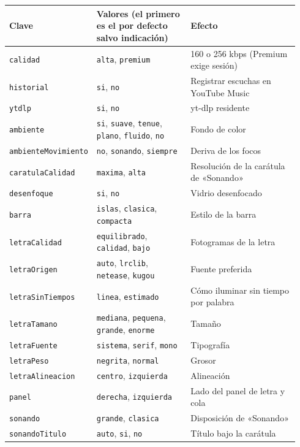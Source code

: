 \begin{center}
\small
\begin{longtable}{@{}p{0.2\linewidth}p{0.34\linewidth}p{0.4\linewidth}@{}}
\toprule
Clave & Valores (el primero es el por defecto salvo indicación) & Efecto \\
\midrule
\endhead
\texttt{calidad} & \texttt{alta}, \texttt{premium} & 160 o 256 kbps (Premium exige sesión) \\
\texttt{historial} & \texttt{si}, \texttt{no} & Registrar escuchas en YouTube Music \\
\texttt{ytdlp} & \texttt{si}, \texttt{no} & yt-dlp residente \\
\texttt{ambiente} & \texttt{si}, \texttt{suave}, \texttt{tenue}, \texttt{plano}, \texttt{fluido}, \texttt{no} & Fondo de color \\
\texttt{ambienteMovimiento} & \texttt{no}, \texttt{sonando}, \texttt{siempre} & Deriva de los focos \\
\texttt{caratulaCalidad} & \texttt{maxima}, \texttt{alta} & Resolución de la carátula de «Sonando» \\
\texttt{desenfoque} & \texttt{si}, \texttt{no} & Vidrio desenfocado \\
\texttt{barra} & \texttt{islas}, \texttt{clasica}, \texttt{compacta} & Estilo de la barra \\
\texttt{letraCalidad} & \texttt{equilibrado}, \texttt{calidad}, \texttt{bajo} & Fotogramas de la letra \\
\texttt{letraOrigen} & \texttt{auto}, \texttt{lrclib}, \texttt{netease}, \texttt{kugou} & Fuente preferida \\
\texttt{letraSinTiempos} & \texttt{linea}, \texttt{estimado} & Cómo iluminar sin tiempo por palabra \\
\texttt{letraTamano} & \texttt{mediana}, \texttt{pequena}, \texttt{grande}, \texttt{enorme} & Tamaño \\
\texttt{letraFuente} & \texttt{sistema}, \texttt{serif}, \texttt{mono} & Tipografía \\
\texttt{letraPeso} & \texttt{negrita}, \texttt{normal} & Grosor \\
\texttt{letraAlineacion} & \texttt{centro}, \texttt{izquierda} & Alineación \\
\texttt{panel} & \texttt{derecha}, \texttt{izquierda} & Lado del panel de letra y cola \\
\texttt{sonando} & \texttt{grande}, \texttt{clasica} & Disposición de «Sonando» \\
\texttt{sonandoTitulo} & \texttt{auto}, \texttt{si}, \texttt{no} & Título bajo la carátula \\

\end{longtable}
\end{center}
